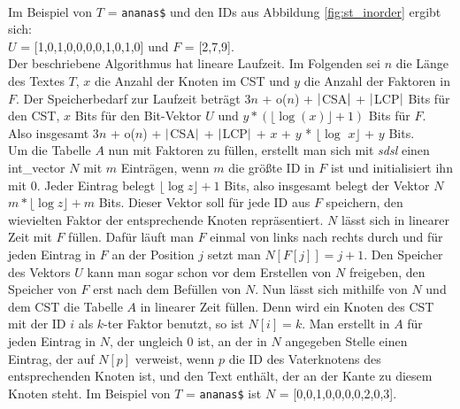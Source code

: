 \documentclass[a4paper,11pt]{scrartcl}%
\theoremstyle{nonumberplain}
\theoremstyle{change}
\theoremstyle{nonumberplain}
\theoremstyle{change}
\theoremstyle{nonumberplain}
\begin{document}
		\\Im Beispiel von $T$ = \texttt{ananas\$} und den IDs aus Abbildung \ref{fig:st_inorder}  ergibt sich: \\
		$U$ = [1,0,1,0,0,0,0,1,0,1,0] und $F$ = [2,7,9].\\
		
		Der beschriebene Algorithmus hat lineare Laufzeit. Im Folgenden sei $n$ die Länge des Textes $T$, $x$ die Anzahl der Knoten im CST und $y$ die Anzahl der Faktoren in $F$.
		Der Speicherbedarf zur Laufzeit beträgt 3$n$ + o($n$) + $\arrowvert$CSA$\arrowvert$ + $\arrowvert$LCP$\arrowvert$ Bits für den CST\cite{cheetsheet}, $x$ Bits für den Bit-Vektor $U$ und $y * (\lfloor\log(x)\rfloor+1)$ Bits für $F$. \\Also insgesamt 3$n$ + o($n$) + $\arrowvert$CSA$\arrowvert$ + $\arrowvert$LCP$\arrowvert$ + $x$ + $y$ * $\lfloor\log$ $x\rfloor$ + $y$ Bits.\\
		Um die Tabelle $A$ nun mit Faktoren zu füllen, erstellt man sich mit \textit{sdsl} einen int\_vector $N$ mit $m$ Einträgen, wenn $m$ die größte ID in $F$ ist und initialisiert ihn mit 0. Jeder Eintrag belegt $\lfloor \log z\rfloor + 1$ Bits, also insgesamt belegt der Vektor $N$ $m * \lfloor \log z\rfloor + m$ Bits. Dieser Vektor soll für jede ID aus $F$ speichern, den wievielten Faktor der entsprechende Knoten repräsentiert. $N$ lässt sich in linearer Zeit mit $F$ füllen. Dafür läuft man $F$ einmal von links nach rechts durch und für jeden Eintrag in $F$ an der Position $j$ setzt man $N[F[j]] = j + 1$. Den Speicher des Vektors $U$ kann man sogar schon vor dem Erstellen von $N$ freigeben, den Speicher von $F$ erst nach dem Befüllen von $N$. Nun lässt sich mithilfe von $N$ und dem CST die Tabelle $A$ in linearer Zeit füllen. Denn wird ein Knoten des CST mit der ID $i$ als $k$-ter Faktor benutzt, so ist $N[i]=k$. Man erstellt in $A$ für jeden Eintrag in $N$, der ungleich 0 ist, an der in $N$ angegeben Stelle einen Eintrag, der auf $N[p]$ verweist, wenn $p$ die ID des Vaterknotens des entsprechenden Knoten ist, und den Text enthält, der an der Kante zu diesem Knoten steht. Im Beispiel von $T$ = \texttt{ananas\$} ist $N$ = [0,0,1,0,0,0,0,2,0,3].
		
\end{document}

